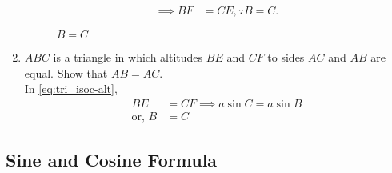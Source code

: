 \begin{enumerate}[label=\thesubsection.\arabic*.,ref=\thesubsection.\theenumi]
\begin{align}
	\implies BF &= CE, \because B = C.
\end{align}
\begin{figure}[H]
	\centering
		\resizebox{0.6\columnwidth}{!}{}
	\caption{$B = C$}
	\label{fig:tri_isoc-alt}
\end{figure}
\item $ABC$ is a triangle in which altitudes $BE$ and $CF$ to sides $AC$ and $AB$ are equal. Show that
%
$AB = AC$.
%
\\
\solution
	In \eqref{eq:tri_isoc-alt},
\begin{align}
	BE &= CF \implies 
	 a \sin C
	= a \sin B 
	\\
	\text{or, } B &= C
\end{align}
\end{enumerate}
\subsection{Sine and Cosine Formula}
